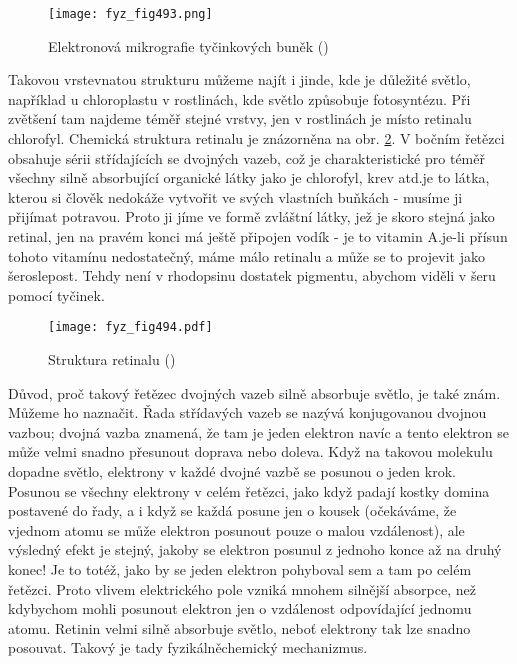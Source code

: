     \begin{figure}[ht!] %
      \centering
      \texttt{[image: fyz\_fig493.png]}
      \caption{Elektronová mikrografie tyčinkových buněk (\cite[s.~697]{Feynman01})}
      \label{fyz:fig493}
    \end{figure}

    Takovou vrstevnatou strukturu můžeme najít i jinde, kde je důležité světlo, například u
    chloroplastu v rostlinách, kde světlo způsobuje fotosyntézu. Při zvětšení tam najdeme téměř
    stejné vrstvy, jen v rostlinách je místo retinalu chlorofyl. Chemická struktura retinalu je
    znázorněna na obr. \ref{fyz:fig494}. V bočním řetězci obsahuje sérii střídajících se dvojných
    vazeb, což je charakteristické pro téměř všechny silně absorbující organické látky jako je
    chlorofyl, krev atd.je to látka, kterou si člověk nedokáže vytvořit ve svých vlastních buňkách -
    musíme ji přijímat potravou. Proto ji jíme ve formě zvláštní látky, jež je skoro stejná jako
    retinal, jen na pravém konci má ještě připojen vodík - je to vitamin A.je-li přísun tohoto
    vitamínu nedostatečný, máme málo retinalu a může se to projevit jako šeroslepost. Tehdy není v
    rhodopsinu dostatek pigmentu, abychom viděli v šeru pomocí tyčinek.

    \begin{figure}[ht!] %
      \centering
      \texttt{[image: fyz\_fig494.pdf]}
      \caption{Struktura retinalu (\cite[s.~697]{Feynman01})}
      \label{fyz:fig494}
    \end{figure}

    Důvod, proč takový řetězec dvojných vazeb silně absorbuje světlo, je také znám. Můžeme ho
    naznačit. Řada střídavých vazeb se nazývá konjugovanou dvojnou vazbou; dvojná vazba znamená, že
    tam je jeden elektron navíc a tento elektron se může velmi snadno přesunout doprava nebo doleva.
    Když na takovou molekulu dopadne světlo, elektrony v každé dvojné vazbě se posunou o jeden krok.
    Posunou se všechny elektrony v celém řetězci, jako když padají kostky domina postavené do řady,
    a i když se každá posune jen o kousek (očekáváme, že vjednom atomu se může elektron posunout
    pouze o malou vzdálenost), ale výsledný efekt je stejný, jakoby se elektron posunul z jednoho
    konce až na druhý konec! Je to totéž, jako by se jeden elektron pohyboval sem a tam po celém
    řetězci. Proto vlivem elektrického pole vzniká mnohem silnější absorpce, než kdybychom mohli
    posunout elektron jen o vzdálenost odpovídající jednomu atomu. Retinin velmi silně absorbuje
    světlo, neboť elektrony tak lze snadno posouvat. Takový je tady fyzikálněchemický mechanizmus.

